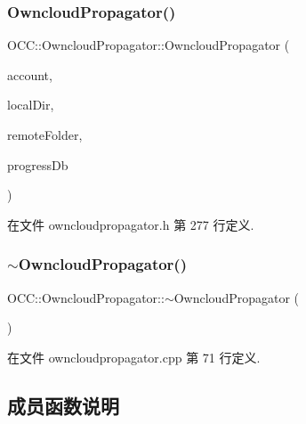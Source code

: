 \subsubsection{\texorpdfstring{Owncloud\+Propagator()}{OwncloudPropagator()}}
{\footnotesize\ttfamily O\+C\+C\+::\+Owncloud\+Propagator\+::\+Owncloud\+Propagator (\begin{DoxyParamCaption}\item[{\hyperlink{namespace_o_c_c_a848616aedb9188e223c6b9867757fe69}{Account\+Ptr}}]{account,  }\item[{const Q\+String \&}]{local\+Dir,  }\item[{const Q\+String \&}]{remote\+Folder,  }\item[{\hyperlink{class_o_c_c_1_1_sync_journal_db}{Sync\+Journal\+Db} $\ast$}]{progress\+Db }\end{DoxyParamCaption})}



在文件 owncloudpropagator.\+h 第 277 行定义.

\mbox{\label{class_o_c_c_1_1_owncloud_propagator_a838d69319f20a48b445e4231faa71296}} 
\subsubsection{\texorpdfstring{$\sim$\+Owncloud\+Propagator()}{~OwncloudPropagator()}}
{\footnotesize\ttfamily O\+C\+C\+::\+Owncloud\+Propagator\+::$\sim$\+Owncloud\+Propagator (\begin{DoxyParamCaption}{ }\end{DoxyParamCaption})}



在文件 owncloudpropagator.\+cpp 第 71 行定义.



\subsection{成员函数说明}
\mbox{\label{class_o_c_c_1_1_owncloud_propagator_ae7fa9ddba35fbae1f8fbcb54d1a6863a}} 
